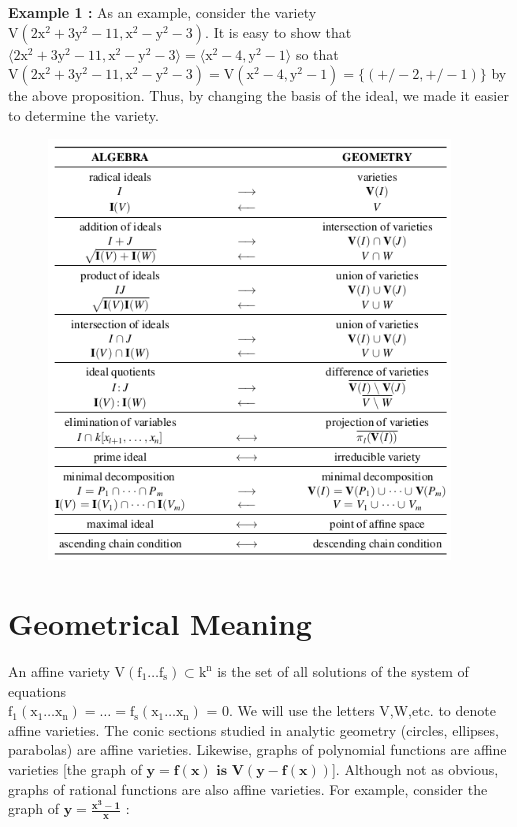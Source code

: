\documentclass[11pt]{article}
\begin{document}
 \textbf{Example 1 :}\newline
As an example, consider the variety $\mathrm{V(2x^2+3y^2-11,x^2-y^2-3)}$. \newline It is easy to show that $\mathrm{\langle 2x^2+3y^2-11,x^2-y^2-3 \rangle = \langle x^2-4,y^2-1 \rangle }$  so that \newline $\mathrm{V(2x^2+3y^2-11,x^2-y^2-3)=V(x^2-4,y^2-1)=\{(+/-2,+/-1)\} }$ \newline
by the above proposition. Thus, by changing the basis of the ideal, we made it easier
to determine the variety.




\begin{figure}[H]
  \begin{center}
    \includegraphics[width=0.95\textwidth]{algebra_geometry.png}
    \caption{}
    \label{fig: }
  \end{center}
\end{figure}

\section{Geometrical Meaning}

An affine variety $\mathrm{V(f_1 \ldots f_s)	\subset k^n}$ is the set of all solutions of the system of equations \\
 $\mathrm{f_1(x_1 \ldots x_n) = \ldots = f_s(x_1 \ldots x_n)}$ = 0. We will use the letters V,W,etc. to denote affine varieties. \cite{coxLittleOshea}
 \newline
 \newline
The conic sections studied in analytic geometry (circles, ellipses, parabolas) are affine varieties. Likewise, graphs of polynomial functions are affine varieties
[the graph of $\mathbf{y= f(x) \text{} \text{ is } \text{} V(y - f(x))}$].
Although not as obvious, graphs of rational functions are also affine varieties. For example, consider the graph of $\mathbf{y= \frac{x^3 -1}{x}}$ :
\end{document}
